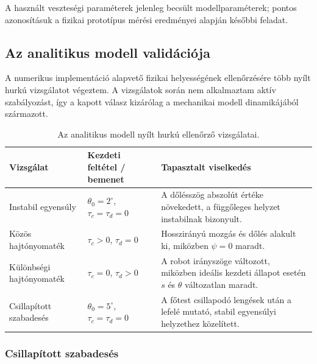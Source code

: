 \documentclass[12pt,a4paper]{report}
\begin{document}
	A használt veszteségi paraméterek jelenleg becsült modellparaméterek;
	pontos azonosításuk a fizikai prototípus mérési eredményei alapján
	későbbi feladat.
	
	\subsection{Az analitikus modell validációja}
	
	A numerikus implementáció alapvető fizikai helyességének ellenőrzésére
	több nyílt hurkú vizsgálatot végeztem. A vizsgálatok során nem alkalmaztam
	aktív szabályozást, így a kapott válasz kizárólag a mechanikai modell
	dinamikájából származott.
	
	\begin{table}[htbp]
		\centering
		\caption{Az analitikus modell nyílt hurkú ellenőrző vizsgálatai.}
		\label{tab:modell_validacio}
		\begin{tabular}{p{}p{}p{}}
			\hline
			\textbf{Vizsgálat}
			& \textbf{Kezdeti feltétel / bemenet}
			& \textbf{Tapasztalt viselkedés} \\
			\hline
			
			Instabil egyensúly
			&
			$\theta_0=2^\circ$,
			$\tau_c=\tau_d=0$
			&
			A dőlésszög abszolút értéke növekedett, a függőleges helyzet instabilnak bizonyult.
			\\[2mm]
			
			Közös hajtónyomaték
			&
			$\tau_c>0$,
			$\tau_d=0$
			&
			Hosszirányú mozgás és dőlés alakult ki, miközben $\psi=0$ maradt.
			\\[2mm]
			
			Különbségi hajtónyomaték
			&
			$\tau_c=0$,
			$\tau_d>0$
			&
			A robot irányszöge változott, miközben ideális kezdeti állapot esetén $s$ és $\theta$ változatlan maradt.
			\\[2mm]
			
			Csillapított szabadesés
			&
			$\theta_0=5^\circ$,
			$\tau_c=\tau_d=0$
			&
			A főtest csillapodó lengések után a lefelé mutató, stabil egyensúlyi helyzethez közelített.
			\\
			\hline
		\end{tabular}
	\end{table}
	

	\subsubsection{Csillapított szabadesés}
	
\end{document}
